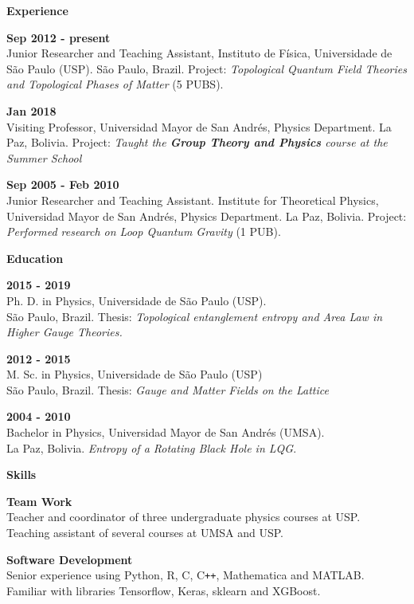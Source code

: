 \documentclass[a4paper,12pt,final]{memoir}
\newcommand{\Sep}{\vspace{1.5em}}
\newcommand{\SmallSep}{\vspace{0.5em}}
\newcommand{\CVSection}[1]
	{\Large\textbf{#1}\par
	\SmallSep\normalsize\normalfont}
\newcommand{\CVItem}[1]
	{\textbf{\color{RoyalBlue} #1}}
\begin{document}
\CVSection{Experience}
\CVItem{Sep 2012 - present}\\
Junior Researcher and Teaching Assistant,  Instituto de F\'{i}sica, Universidade de S\~{a}o Paulo 
(USP). S\~{a}o Paulo, Brazil. Project: \emph{Topological Quantum Field Theories and Topological Phases of Matter} (5 PUBS).
\SmallSep


\CVItem{Jan 2018}\\
Visiting Professor, Universidad Mayor de San Andr\'{e}s, Physics Department. La Paz, Bolivia. Project: \emph{Taught the \textbf{Group Theory and Physics} course at the Summer School}
\SmallSep

\CVItem{Sep 2005 - Feb 2010}\\
Junior Researcher and Teaching Assistant. Institute for Theoretical Physics,
Universidad Mayor de San Andr\'{e}s, Physics Department. La Paz, Bolivia. Project: \emph{Performed research on Loop Quantum Gravity} (1 PUB).

\Sep

\CVSection{Education}
\CVItem{2015 - 2019}\\
Ph. D. in Physics, Universidade de S\~{a}o Paulo (USP).\\ 
S\~{a}o Paulo, Brazil. Thesis:  \emph{Topological entanglement entropy and Area Law in Higher Gauge Theories.} 
\SmallSep

\CVItem{2012 - 2015}\\
M. Sc. in Physics, Universidade de S\~{a}o Paulo (USP)\\
S\~{a}o Paulo, Brazil. Thesis: \emph{Gauge and Matter Fields on the Lattice}
\SmallSep

\CVItem{2004 - 2010}\\
Bachelor in Physics, Universidad Mayor de San Andr\'{e}s (UMSA).\\
La Paz, Bolivia. \emph{Entropy of a Rotating Black Hole in LQG}.

\Sep

\CVSection{Skills}


\CVItem{Team Work}\\
Teacher and coordinator of three undergraduate physics courses at USP.\\
Teaching assistant of several courses at UMSA and USP.
\SmallSep

\CVItem{Software Development}\\
Senior experience using Python, R, C, C\texttt{++}, Mathematica and MATLAB.\\
Familiar with libraries Tensorflow, Keras, sklearn and XGBoost. 




\end{document}

